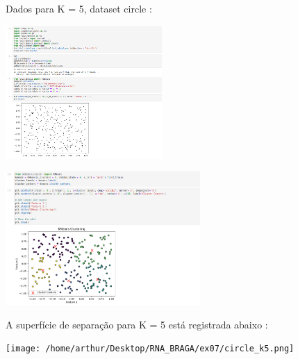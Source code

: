 \documentclass{article}
\begin{document}
\vspace{10pt}

Dados para K = 5, dataset circle : 

\vspace{10pt}

\begin{center}

\includegraphics[height=2in]{circle_data.png}
    
\end{center}

\vspace{10pt}

\begin{center}

\includegraphics[height=2in]{circle_cluster.png}
        
\end{center}

\vspace{10pt}

A superfície de separação para K = 5 está registrada abaixo : 

\vspace{10pt}

\begin{center}

\texttt{[image: /home/arthur/Desktop/RNA\_BRAGA/ex07/circle\_k5.png]}
            
\end{center}

\vspace{10pt}
\end{document}
